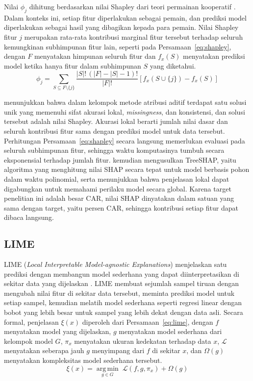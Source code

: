 Nilai $\phi_j$ dihitung berdasarkan nilai Shapley dari teori permainan kooperatif \autocite{shapley1953}. Dalam konteks ini, setiap fitur diperlakukan sebagai pemain, dan prediksi model diperlakukan sebagai hasil yang dibagikan kepada para pemain. Nilai Shapley fitur $j$ merupakan rata-rata kontribusi marginal fitur tersebut terhadap seluruh kemungkinan subhimpunan fitur lain, seperti pada Persamaan~\ref{eq:shapley}, dengan $F$ menyatakan himpunan seluruh fitur dan $f_x(S)$ menyatakan prediksi model ketika hanya fitur dalam subhimpunan $S$ yang diketahui.
\begin{equation}
\phi_j = \sum_{S \subseteq F \setminus \{j\}} \frac{|S|!\,\left(|F| - |S| - 1\right)!}{|F|!} \left[ f_x\left(S \cup \{j\}\right) - f_x(S) \right]
\label{eq:shapley}
\end{equation}

\textcite{lundberg2017} menunjukkan bahwa dalam kelompok metode atribusi aditif terdapat satu solusi unik yang memenuhi sifat akurasi lokal, \emph{missingness}, dan konsistensi, dan solusi tersebut adalah nilai Shapley. Akurasi lokal berarti jumlah nilai dasar dan seluruh kontribusi fitur sama dengan prediksi model untuk data tersebut. Perhitungan Persamaan~\ref{eq:shapley} secara langsung memerlukan evaluasi pada seluruh subhimpunan fitur, sehingga waktu komputasinya tumbuh secara eksponensial terhadap jumlah fitur. \textcite{lundberg2020} kemudian mengusulkan TreeSHAP, yaitu algoritma yang menghitung nilai SHAP secara tepat untuk model berbasis pohon dalam waktu polinomial, serta menunjukkan bahwa penjelasan lokal dapat digabungkan untuk memahami perilaku model secara global. Karena target penelitian ini adalah besar CAR, nilai SHAP dinyatakan dalam satuan yang sama dengan target, yaitu persen CAR, sehingga kontribusi setiap fitur dapat dibaca langsung.

\subsection{LIME}

LIME (\emph{Local Interpretable Model-agnostic Explanations}) menjelaskan satu prediksi dengan membangun model sederhana yang dapat diinterpretasikan di sekitar data yang dijelaskan \autocite{ribeiro2016}. LIME membuat sejumlah sampel tiruan dengan mengubah nilai fitur di sekitar data tersebut, meminta prediksi model untuk setiap sampel, kemudian melatih model sederhana seperti regresi linear dengan bobot yang lebih besar untuk sampel yang lebih dekat dengan data asli. Secara formal, penjelasan $\xi(x)$ diperoleh dari Persamaan~\ref{eq:lime}, dengan $f$ menyatakan model yang dijelaskan, $g$ menyatakan model sederhana dari kelompok model $G$, $\pi_x$ menyatakan ukuran kedekatan terhadap data $x$, $\mathcal{L}$ menyatakan seberapa jauh $g$ menyimpang dari $f$ di sekitar $x$, dan $\Omega(g)$ menyatakan kompleksitas model sederhana tersebut.
\begin{equation}
\xi(x) = \operatorname*{arg\,min}_{g \in G} \; \mathcal{L}\left(f, g, \pi_x\right) + \Omega(g)
\label{eq:lime}
\end{equation}

